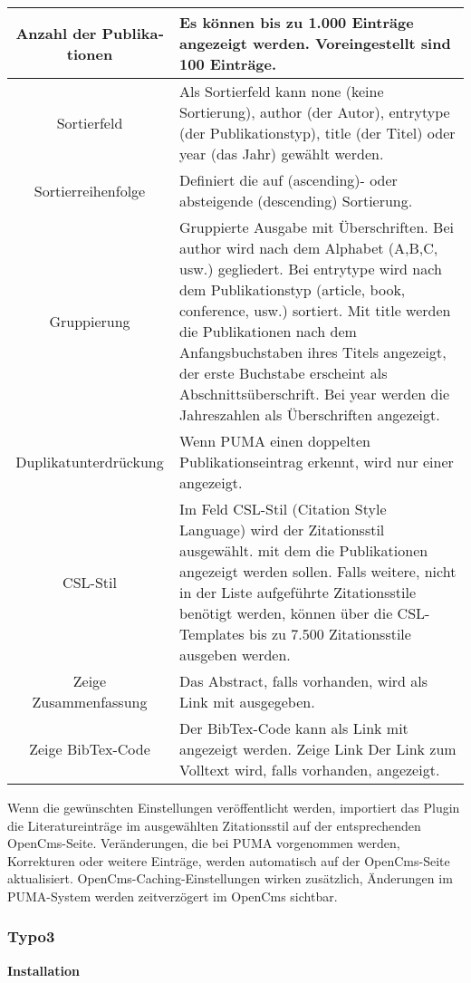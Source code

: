 \documentclass[b5paper,11pt,twoside]{scrbook} %
\begin{document}
\begin{longtable}{|c|p{7cm}|}
Anzahl der Pub­li­ka­tionen &	Es können bis zu 1.000 Einträge angezeigt werden. Voreingestellt sind 100 Einträge.\\ \hline
Sortierfeld &	Als Sortierfeld kann none (keine Sortierung), author (der Autor), entrytype (der Publikationstyp), title (der Titel) oder year (das Jahr) gewählt werden.\\ \hline
Sortierreihenfolge &	Definiert die auf (ascending)- oder absteigende (descending) Sortierung.\\ \hline
Gruppierung &	Gruppierte Ausgabe mit Überschriften. Bei author wird nach dem Alphabet (A,B,C, usw.) gegliedert. Bei entrytype wird nach dem Publikationstyp (article, book, conference, usw.) sortiert. Mit title werden die Publikationen nach dem Anfangsbuchstaben ihres Titels angezeigt, der erste Buchstabe erscheint als Abschnittsüberschrift. Bei year werden die Jahreszahlen als Überschriften angezeigt.\\ \hline
Duplikatunterdrückung &	Wenn PUMA einen doppelten Publikationseintrag erkennt, wird nur einer angezeigt.\\ \hline
CSL-Stil &	Im Feld CSL-Stil (Citation Style Language) wird der Zitationsstil ausgewählt. mit dem die Publikationen angezeigt werden sollen. Falls weitere, nicht in der Liste aufgeführte Zitationsstile benötigt werden, können über die CSL-Templates bis zu 7.500 Zitationsstile ausgeben werden.\\ \hline
Zeige Zusammenfassung& 	Das Abstract, falls vorhanden, wird als Link mit ausgegeben.\\ \hline
Zeige BibTex-Code &	Der BibTex-Code kann als Link mit angezeigt werden.
Zeige Link 	Der Link zum Volltext wird, falls vorhanden, angezeigt.\\ \hline
\end{longtable}
\normalsize

Wenn die gewünschten Einstellungen veröffentlicht werden, importiert das Plugin die Literatureinträge im ausgewählten Zitationsstil auf der entsprechenden OpenCms-Seite. Veränderungen, die bei PUMA vorgenommen werden, Korrekturen oder weitere Einträge, werden automatisch auf der OpenCms-Seite aktualisiert. OpenCms-Caching-Einstellungen wirken zusätzlich, Änderungen im PUMA-System werden zeitverzögert im OpenCms sichtbar.
\subsubsection{Typo3}
\textbf{Installation}\newline
\end{document}
